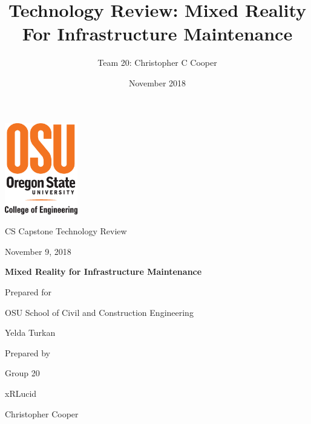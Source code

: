 \documentclass[10pt,draftclsnofoot,onecolumn,letterpaper]{IEEEtran}
\title{Technology Review: Mixed Reality For Infrastructure Maintenance}
\author{Team 20: Christopher C Cooper}
\date{November 2018}
\def \CapstoneTeamName{		xRLucid}
\def \CapstoneTeamNumber{		20}
\def \GroupMemberOne{			Christopher Cooper}
\def \GroupMemberTwo{			Austin Liang}
\def \GroupMemberThree{			David Okubo}
\def \GroupMemberFour{			Jonathan Chen}
\def \GroupMemberFive{			Mingyu Zhang}
\def \CapstoneProjectName{		Mixed Reality for Infrastructure Maintenance}
\def \CapstoneSponsorCompany{	OSU School of Civil and Construction Engineering}
\def \CapstoneSponsorPerson{		Yelda Turkan}
\def \DocType{	%
				Technology Review
				}
\newcommand{\NameSigPair}[1]{\par
\makebox[2.75in][r]{#1} \hfil 	\makebox[3.25in]{\makebox[2.25in]{\hrulefill} \hfill		\makebox[.75in]{\hrulefill}}
\par\vspace{-12pt} \textit{\tiny\noindent
\makebox[2.75in]{} \hfil		\makebox[3.25in]{\makebox[2.25in][r]{Signature} \hfill	\makebox[.75in][r]{Date}}}}
\renewcommand{\NameSigPair}[1]{#1}
\begin{document}
\begin{titlepage}
    \begin{singlespace}
    	\includegraphics[height=4cm]{coe_v_spot1}
        \hfill
        \par\vspace{.2in}
        \centering
        \scshape{
            \huge CS Capstone \DocType \par
            {\large November 9, 2018}\par
            \vspace{.5in}
            \textbf{\Huge\CapstoneProjectName}\par
            \vfill
            {\large Prepared for}\par
            \Huge \CapstoneSponsorCompany\par
            \vspace{5pt}
            {\Large\NameSigPair{\CapstoneSponsorPerson}\par}
            {\large Prepared by }\par
            Group\CapstoneTeamNumber\par
            \CapstoneTeamName\par
            \vspace{5pt}
            {\Large
                \NameSigPair{\GroupMemberOne}\par
            }
            \vspace{20pt}
        }


\end{singlespace}
\end{titlepage}
\end{document}
